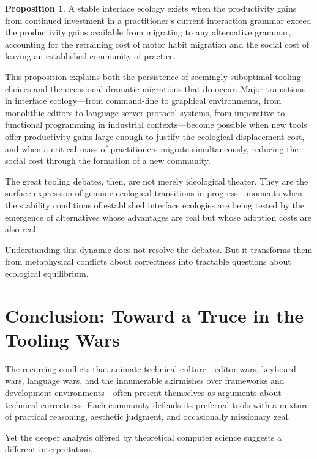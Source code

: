 \documentclass[11pt]{article}
\theoremstyle{definition}
\newtheorem{proposition}{Proposition}[section]
\begin{document}
\begin{proposition}
\label{prop:ecology_equilibrium}
A stable interface ecology exists when the productivity gains from
continued investment in a practitioner's current interaction grammar
exceed the productivity gains available from migrating to any
alternative grammar, accounting for the retraining cost of motor habit
migration and the social cost of leaving an established community of
practice.
\end{proposition}

This proposition explains both the persistence of seemingly suboptimal
tooling choices and the occasional dramatic migrations that do occur.
Major transitions in interface ecology---from command-line to graphical
environments, from monolithic editors to language server protocol
systems, from imperative to functional programming in industrial
contexts---become possible when new tools offer productivity gains
large enough to justify the ecological displacement cost, and when a
critical mass of practitioners migrate simultaneously, reducing the
social cost through the formation of a new community.

The great tooling debates, then, are not merely ideological theater.
They are the surface expression of genuine ecological transitions in
progress---moments when the stability conditions of established
interface ecologies are being tested by the emergence of alternatives
whose advantages are real but whose adoption costs are also real.

Understanding this dynamic does not resolve the debates. But it
transforms them from metaphysical conflicts about correctness into
tractable questions about ecological equilibrium.

\section{Conclusion: Toward a Truce in the Tooling Wars}

The recurring conflicts that animate technical culture---editor wars,
keyboard wars, language wars, and the innumerable skirmishes over
frameworks and development environments---often present themselves as
arguments about technical correctness. Each community defends its
preferred tools with a mixture of practical reasoning, aesthetic
judgment, and occasionally missionary zeal.

Yet the deeper analysis offered by theoretical computer science suggests
a different interpretation.
\end{document}

